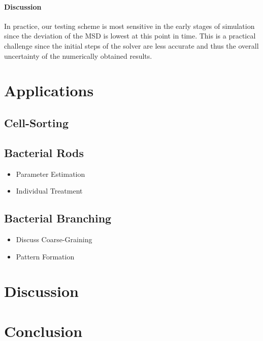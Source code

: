 \documentclass[a4paper]{article}
\begin{document}
\paragraph{Discussion}
In practice, our testing scheme is most sensitive in the early stages of simulation since the
deviation of the MSD is lowest at this point in time.
This is a practical challenge since the initial steps of the solver are less accurate and thus the
overall uncertainty of the numerically obtained results.

\section{Applications}
\subsection{Cell-Sorting}
\subsection{Bacterial Rods}
\begin{itemize}
    \item Parameter Estimation
    \item Individual Treatment
\end{itemize}
\subsection{Bacterial Branching}
\begin{itemize}
    \item Discuss Coarse-Graining
    \item Pattern Formation
\end{itemize}

\section{Discussion}

\section{Conclusion}

\end{document}
